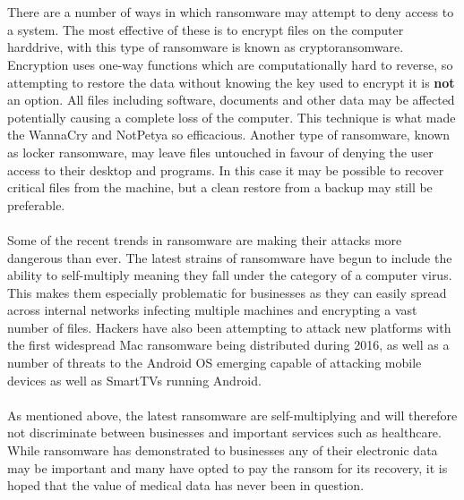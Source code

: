 \documentclass{article}
\begin{document}
\\\\%
There are a number of ways in which ransomware may attempt to deny access to a system. The most effective of these is to encrypt files on the computer harddrive, with this type of ransomware is known as cryptoransomware.
Encryption uses one-way functions which are computationally hard to reverse, so attempting to restore the data without knowing the key used to encrypt it is \textbf{not} an option.
All files including software, documents and other data may be affected potentially causing a complete loss of the computer.
This technique is what made the WannaCry and NotPetya so efficacious.
Another type of ransomware, known as locker ransomware, may leave files untouched in favour of denying the user access to their desktop and programs. In this case it may be possible to recover critical files from the machine, but a clean restore from a backup may still be preferable.
\\\\%
Some of the recent trends in ransomware are making their attacks more dangerous than ever.
The latest strains of ransomware have begun to include the ability to self-multiply meaning they fall under the category of a computer virus. This makes them especially problematic for businesses as they can easily spread across internal networks infecting multiple machines and encrypting a vast number of files.
Hackers have also been attempting to attack new platforms with the first widespread Mac ransomware being distributed during 2016, as well as a number of threats to the Android OS emerging capable of attacking mobile devices as well as SmartTVs running Android. 
\\\\%
As mentioned above, the latest ransomware are self-multiplying and will therefore not discriminate between businesses and important services such as healthcare.
While ransomware has demonstrated to businesses any of their electronic data may be important\cite{security_breaches_survey} and many have opted to pay the ransom for its recovery, it is hoped that the value of medical data has never been in question.
\end{document}
